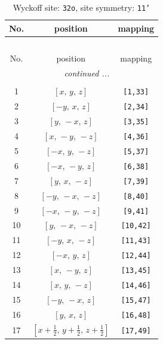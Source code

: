 \documentclass[fleqn,8pt]{jsarticle}
\begin{document}
\renewcommand{\arraystretch}{1.2}
\begin{longtable}{ccc}
\caption{Wyckoff site: {\tt 32o}, site symmetry: {\tt 11'}}
 \\
 \hline \hline
No. & position & mapping \\ \hline \endfirsthead

\multicolumn{2}{l}{\tablename\ \thetable{}} \\
 \hline \hline
No. & position & mapping \\ \hline \endhead

 \hline \hline
\multicolumn{2}{r}{\footnotesize\it continued ...} \\ \endfoot

 \hline \hline
\multicolumn{2}{r}{} \\ \endlastfoot

1 & $\left[ x,\, y,\, z \right]$ & {\tt [1,33]} \\ \hline
2 & $\left[ - y,\, x,\, z \right]$ & {\tt [2,34]} \\ \hline
3 & $\left[ y,\, - x,\, z \right]$ & {\tt [3,35]} \\ \hline
4 & $\left[ x,\, - y,\, - z \right]$ & {\tt [4,36]} \\ \hline
5 & $\left[ - x,\, y,\, - z \right]$ & {\tt [5,37]} \\ \hline
6 & $\left[ - x,\, - y,\, z \right]$ & {\tt [6,38]} \\ \hline
7 & $\left[ y,\, x,\, - z \right]$ & {\tt [7,39]} \\ \hline
8 & $\left[ - y,\, - x,\, - z \right]$ & {\tt [8,40]} \\ \hline
9 & $\left[ - x,\, - y,\, - z \right]$ & {\tt [9,41]} \\ \hline
10 & $\left[ y,\, - x,\, - z \right]$ & {\tt [10,42]} \\ \hline
11 & $\left[ - y,\, x,\, - z \right]$ & {\tt [11,43]} \\ \hline
12 & $\left[ - x,\, y,\, z \right]$ & {\tt [12,44]} \\ \hline
13 & $\left[ x,\, - y,\, z \right]$ & {\tt [13,45]} \\ \hline
14 & $\left[ x,\, y,\, - z \right]$ & {\tt [14,46]} \\ \hline
15 & $\left[ - y,\, - x,\, z \right]$ & {\tt [15,47]} \\ \hline
16 & $\left[ y,\, x,\, z \right]$ & {\tt [16,48]} \\ \hline
17 & $\left[ x + \frac{1}{2},\, y + \frac{1}{2},\, z + \frac{1}{2} \right]$ & {\tt [17,49]} \\ \hline

\end{longtable}
\end{document}
